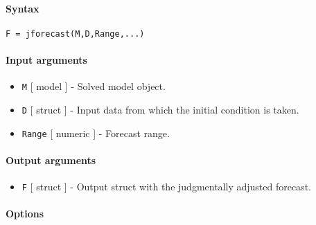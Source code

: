 


	\paragraph{Syntax}\label{syntax}

\begin{verbatim}
F = jforecast(M,D,Range,...)
\end{verbatim}

\paragraph{Input arguments}\label{input-arguments}

\begin{itemize}
\item
  \texttt{M} {[} model {]} - Solved model object.
\item
  \texttt{D} {[} struct {]} - Input data from which the initial
  condition is taken.
\item
  \texttt{Range} {[} numeric {]} - Forecast range.
\end{itemize}

\paragraph{Output arguments}\label{output-arguments}

\begin{itemize}
\itemsep1pt\parskip0pt
\item
  \texttt{F} {[} struct {]} - Output struct with the judgmentally
  adjusted forecast.
\end{itemize}

\paragraph{Options}\label{options}

